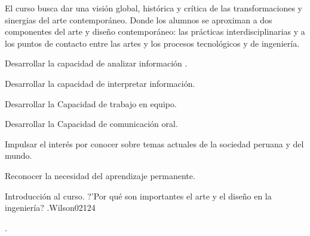 \begin{syllabus}


\begin{justification}
El curso busca  dar  una visión  global, histórica  y crítica de las transformaciones y sinergias del arte contemporáneo. Donde los alumnos se aproximan a dos componentes del arte y diseño contemporáneo: las prácticas interdisciplinarias  y a los puntos de contacto entre las artes y los procesos tecnológicos y de ingeniería.
\end{justification}

\begin{goals}
    \item Desarrollar la capacidad de analizar información .
    \item Desarrollar la capacidad de interpretar información.
    \item Desarrollar la Capacidad de trabajo en equipo.
    \item Desarrollar la Capacidad de comunicación oral.
    \item Impulsar el interés por conocer sobre temas actuales de la sociedad peruana y del mundo.
    \item Reconocer la necesidad del aprendizaje permanente.
\end{goals}

\begin{outcomes}
    \item {} %
    \item {} %
    \item {} %
    \item {} %
    \item {} %
\end{outcomes}

\begin{competences}
    \item {}
    \item {}
    \item {}
    \item {}
\end{competences}

\begin{unit}{Introducción al curso. ?'Por qué son importantes el arte y el diseño en la ingeniería? .}{}{Wilson02}{12}{4}
   \begin{topics}
      \item . 
   \end{topics}
   \begin{learningoutcomes}
      \item 
   \end{learningoutcomes}
\end{unit}


\end{syllabus}
